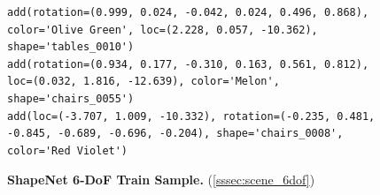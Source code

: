 \begin{figure}
\centering
{}
\begin{verbatim}
add(rotation=(0.999, 0.024, -0.042, 0.024, 0.496, 0.868), color='Olive Green', loc=(2.228, 0.057, -10.362), shape='tables_0010')
add(rotation=(0.934, 0.177, -0.310, 0.163, 0.561, 0.812), loc=(0.032, 1.816, -12.639), color='Melon', shape='chairs_0055')
add(loc=(-3.707, 1.009, -10.332), rotation=(-0.235, 0.481, -0.845, -0.689, -0.696, -0.204), shape='chairs_0008', color='Red Violet')
\end{verbatim}
\caption{\textbf{ShapeNet 6-DoF Train Sample.} (\cref{sssec:scene_6dof})}
\label{fig:code_scene_6dof}
\end{figure}
